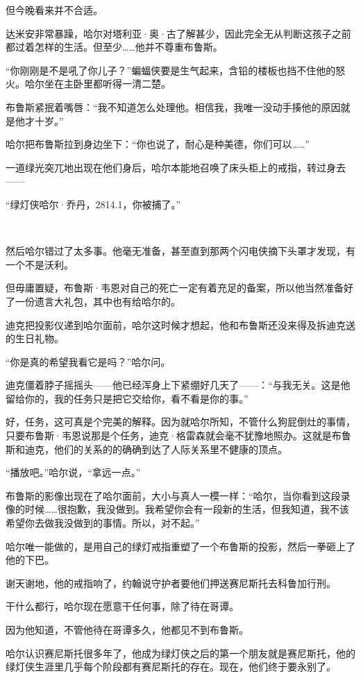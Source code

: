 \documentclass[../main]{subfiles}
\begin{document}
但今晚看来并不合适。

达米安非常暴躁，哈尔对塔利亚·奥·古了解甚少，因此完全无从判断这孩子之前都过着怎样的生活。但至少……他并不尊重布鲁斯。

“你刚刚是不是吼了你儿子？”蝙蝠侠要是生气起来，含铅的楼板也挡不住他的怒火。哈尔坐在主卧里都听得一清二楚。

布鲁斯紧抿着嘴唇：“我不知道怎么处理他。相信我，我唯一没动手揍他的原因就是他才十岁。”

哈尔把布鲁斯拉到身边坐下：“你也说了，耐心是种美德，你们可以……”

一道绿光突兀地出现在他们身后，哈尔本能地召唤了床头柜上的戒指，转过身去——

“绿灯侠哈尔·乔丹，2814.1，你被捕了。”

~\

然后哈尔错过了太多事。他毫无准备，甚至直到那两个闪电侠摘下头罩才发现，有一个不是沃利。

但毋庸置疑，布鲁斯·韦恩对自己的死亡一定有着充足的备案，所以他当然准备好了一份遗言大礼包，其中也有给哈尔的。

迪克把投影仪递到哈尔面前，哈尔这时候才想起，他和布鲁斯还没来得及拆迪克送的生日礼物。

“你是真的希望我看它是吗？”哈尔问。

迪克僵着脖子摇摇头——他已经浑身上下紧绷好几天了——：“与我无关。这是他留给你的，我的任务只是把它交给你，看不看是你的事。”

好，任务，这可真是个完美的解释。因为就哈尔所知，不管什么狗屁倒灶的事情，只要布鲁斯·韦恩说那是个任务，迪克·格雷森就会毫不犹豫地照办。这就是布鲁斯和迪克，他们的关系的的确确到达了人际关系里不健康的顶点。

“播放吧。”哈尔说，“拿远一点。”

布鲁斯的影像出现在了哈尔面前，大小与真人一模一样：“哈尔，当你看到这段录像的时候……很抱歉，我没做到。我希望你会有一段新的生活，但我知道，我不该希望你去做我没做到的事情。所以，对不起。”

哈尔唯一能做的，是用自己的绿灯戒指重塑了一个布鲁斯的投影，然后一拳砸上了他的下巴。

谢天谢地，他的戒指响了，约翰说守护者要他们押送赛尼斯托去科鲁加行刑。

干什么都行，哈尔现在愿意干任何事，除了待在哥谭。

因为他知道，不管他待在哥谭多久，他都见不到布鲁斯。

哈尔认识赛尼斯托很多年了，他成为绿灯侠之后的第一个朋友就是赛尼斯托，他的绿灯侠生涯里几乎每个阶段都有赛尼斯托的存在。现在，他们终于要永别了。
\end{document}
